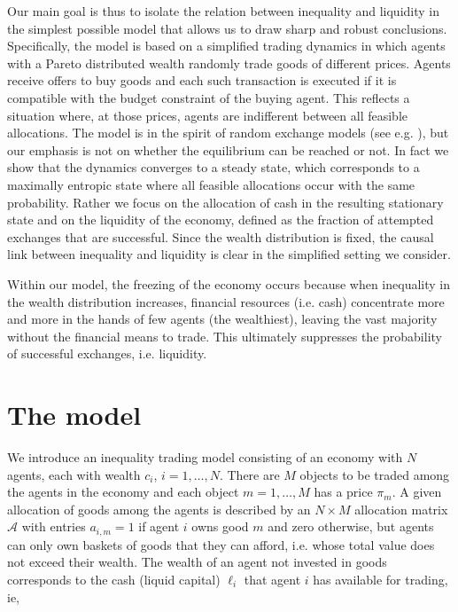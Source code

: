 Our main goal is thus to isolate the relation between inequality and liquidity in the simplest possible model that allows us to draw sharp and robust conclusions. Specifically, the model is based on a simplified trading dynamics in which agents with a Pareto distributed wealth randomly trade goods of different prices.  Agents receive offers to buy goods and each such transaction is executed if it is compatible with the budget constraint of the buying agent. This reflects a situation where, at those prices, agents are indifferent between all feasible allocations. The model is in the spirit of random exchange models (see e.g. \cite{Foley1994, SjurFlam2012, Yakovenko2009Review}), but our emphasis is not on whether the equilibrium can be reached or not. In fact we show that the dynamics converges to a steady state, which corresponds to a maximally entropic state where all feasible allocations occur with the same probability. Rather we focus on the allocation of cash in the resulting stationary state and on the liquidity of the economy, defined as the fraction of attempted exchanges that are successful. Since the wealth distribution is fixed, the causal link between inequality and liquidity is clear in the simplified setting we consider.

Within our model, the freezing of the economy occurs because when inequality in the wealth distribution increases, financial resources (i.e. cash) concentrate more and more in the hands of few agents (the wealthiest), leaving the vast majority without the financial means to trade. This ultimately suppresses the probability of successful exchanges, i.e. liquidity. 


\section{The model}
\label{sec:modelDescription}

We introduce an inequality trading model consisting of an economy with $N$ agents, each with wealth $c_i$, $ i = 1, \ldots, N$. There are $M$ objects to be traded among the agents in the economy and each object $m = 1, \ldots,M$ has a price $\pi_m$. A given allocation of goods among the agents is described by an $N\times M$ allocation matrix $\mathcal{A}$ with entries $a_{i,m} = 1$ if agent $i$ owns good $m$ and zero otherwise, but agents can only own baskets of goods that they can afford, i.e. whose total value does not exceed their wealth. The wealth of an agent not invested in goods corresponds to the cash (liquid capital) $\ell_i$ that agent $i$ has available for trading, ie,


